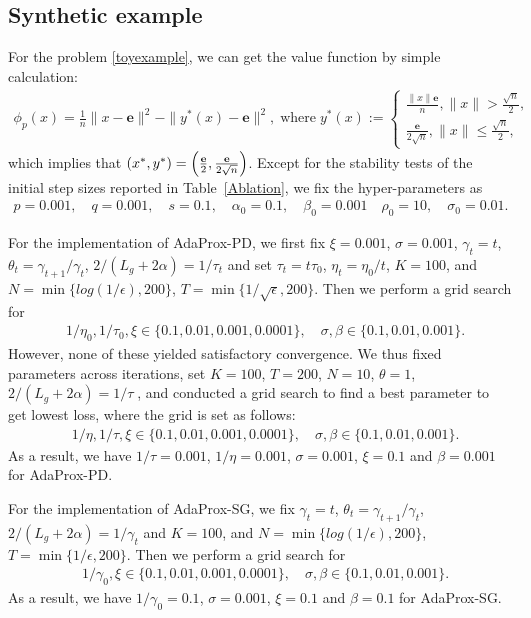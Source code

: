 \documentclass{article}
\def\x{x}
\def\y{y}
\begin{document}
    \subsection{Synthetic example}\label{toyappendix}
    For the problem \ref{toyexample}, we can get the value function by simple calculation:
    \begin{align}\label{contour}
        \phi_{p}(\x)=\frac{1}{n}\|x-\mathbf{e}\|^2-\|\y^{*}(x)-\mathbf{e}\|^2,\; \text{where}\; \y^{*}(x):=\begin{cases}
        \frac{\|x\|\mathbf{e}}{n}, \|x\|>\frac{\sqrt{n}}{2},\\
        \frac{\mathbf{e}}{2\sqrt{n}}, \|x\|\le\frac{\sqrt{n}}{2},
    \end{cases}
    \end{align}
    which implies that \((\x^*,\y^*)=\Bigl(\tfrac{\mathbf{e}}2,\tfrac{\mathbf{e}}{2\sqrt{n}}\Bigr)\). 
    Except for the stability tests of the initial step sizes reported in Table~\ref{Ablation}, we fix the hyper-parameters as
    \begin{align}\label{initial}
        p = 0.001,\quad
    q = 0.001,\quad s=0.1, \quad
    \alpha_0 = 0.1,\quad \beta_0=0.001\quad
    \rho_0=10,\quad\sigma_0 = 0.01.
    \end{align}
    
    For the implementation of AdaProx-PD, we first fix $\xi=0.001$, $\sigma=0.001$, $\gamma_t=t$, $\theta_t=\gamma_{t+1}/\gamma_t$, $2/(L_g+2\alpha)=1/\tau_t$ and set $\tau_t=t\tau_0$, $\eta_t=\eta_0/t$, $K=100$, and $N=\min\{log(1/\epsilon),200\}$, $T=\min\{1/\sqrt{\epsilon},200\}$. Then we perform a grid search for 
    \begin{align*}
        &1/\eta_0,1/\tau_0,\xi\in\{0.1,0.01,0.001,0.0001\},\quad \sigma,\beta\in\{0.1,0.01,0.001\}.
    \end{align*}
    However, none of these yielded satisfactory convergence. We thus fixed parameters across iterations, set $K=100$, $T=200$, $N=10$, $\theta=1$, $2/(L_g+2\alpha)=1/\tau\; $, and conducted a grid search to find a best parameter to get lowest loss, where the grid is set as follows:
    \begin{align*}
        &1/\eta,1/\tau,\xi\in\{0.1,0.01,0.001,0.0001\}, \quad\sigma,\beta\in\{0.1,0.01,0.001\}.
    \end{align*}
    As a result, we have $1/\tau=0.001$, $1/\eta=0.001$, $\sigma=0.001$, $\xi=0.1$ and $\beta=0.001$ for AdaProx-PD.

    For the implementation of AdaProx-SG, we fix $\gamma_t=t$, $\theta_t=\gamma_{t+1}/\gamma_t$, $2/(L_g+2\alpha)=1/\gamma_t$ and  $K=100$, and $N=\min\{log(1/\epsilon),200\}$, $T=\min\{1/\epsilon,200\}$. Then we perform a grid search for 
    \begin{align*}
        &1/\gamma_0,\xi\in\{0.1,0.01,0.001,0.0001\},\quad \sigma,\beta\in\{0.1,0.01,0.001\}.
    \end{align*}
    As a result, we have  $1/\gamma_0=0.1$, $\sigma=0.001$, $\xi=0.1$ and $\beta=0.1$ for AdaProx-SG.
    
\end{document}
